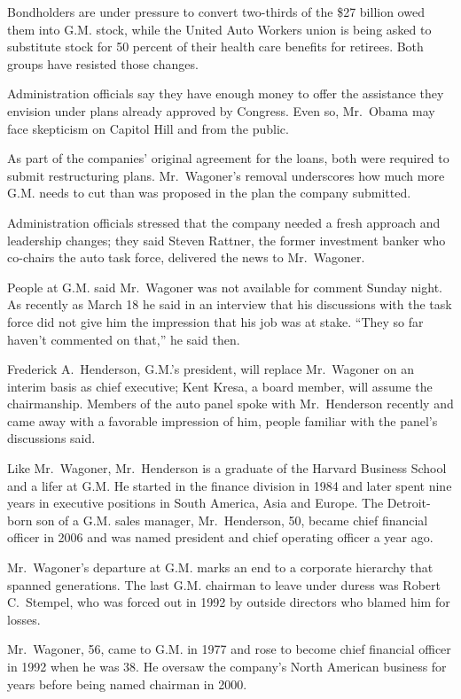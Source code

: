 \documentclass[12pt,a4paper,onecolumn]{article}
\begin{document}
Bondholders are under pressure to convert two-thirds of the \$27 billion owed them into G.M. stock,
while the United Auto Workers union is being asked to substitute stock for 50 percent of their
health care benefits for retirees. Both groups have resisted those changes.

Administration officials say they have enough money to offer the assistance they envision under
plans already approved by Congress. Even so, Mr.~Obama may face skepticism on Capitol Hill and from
the public.

As part of the companies' original agreement for the loans, both were required to submit
restructuring plans. Mr.~Wagoner's removal underscores how much more G.M. needs to cut than was
proposed in the plan the company submitted.

Administration officials stressed that the company needed a fresh approach and leadership changes;
they said Steven Rattner, the former investment banker who co-chairs the auto task force, delivered
the news to Mr.~Wagoner.

People at G.M. said Mr.~Wagoner was not available for comment Sunday night. As recently as March 18
he said in an interview that his discussions with the task force did not give him the impression
that his job was at stake. ``They so far haven't commented on that,'' he said then.

Frederick A.~Henderson, G.M.'s president, will replace Mr.~Wagoner on an interim basis as chief
executive; Kent Kresa, a board member, will assume the chairmanship. Members of the auto panel spoke
with Mr.~Henderson recently and came away with a favorable impression of him, people familiar with
the panel's discussions said.

Like Mr.~Wagoner, Mr.~Henderson is a graduate of the Harvard Business School and a lifer at G.M. He
started in the finance division in 1984 and later spent nine years in executive positions in South
America, Asia and Europe. The Detroit-born son of a G.M. sales manager, Mr.~Henderson, 50, became
chief financial officer in 2006 and was named president and chief operating officer a year ago.

Mr.~Wagoner's departure at G.M. marks an end to a corporate hierarchy that spanned generations. The
last G.M. chairman to leave under duress was Robert C.~Stempel, who was forced out in 1992 by
outside directors who blamed him for losses.

Mr.~Wagoner, 56, came to G.M. in 1977 and rose to become chief financial officer in 1992 when he was
38. He oversaw the company's North American business for years before being named chairman in 2000.
\end{document}
